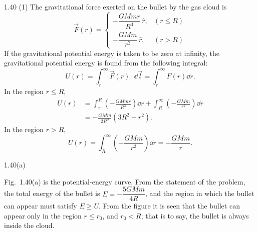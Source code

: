 \begin{solution}{1.40}
(1) The gravitational force exerted on the bullet by the gas cloud is
\begin{equation}
\vec{F}(r)=
\begin{cases}
-\dfrac{GMmr}{R^3}\,\hat{r}, & (r\le R)\\[2mm]
-\dfrac{GMm}{r^2}\,\hat{r}, & (r>R)
\end{cases} \tag{1}
\end{equation}
If the gravitational potential energy is taken to be zero at infinity, the gravitational potential energy is found from the following integral:
\begin{equation}
U(r)=\int_r^\infty\vec{F}(r)\cdot\dd\vec{l}=\int_r^\infty F(r)\dd r. \tag{2}
\end{equation}
In the region $r\le R$,
\begin{equation}
\begin{aligned}
U(r)&=\int_r^R\left(-\frac{GMmr}{R^3}\right)\dd r
+\int_R^\infty\left(-\frac{GMm}{r^2}\right)\dd r\\
&=-\frac{GMm}{2R^3}\left(3R^2-r^2\right).
\end{aligned} \tag{3}
\end{equation}
In the region $r>R$,
\begin{equation}
U(r)=\int_R^\infty\left(-\frac{GMm}{r^2}\right)\dd r=-\frac{GMm}{r}. \tag{4}
\end{equation}

\begin{figbox}{1.40(a)}
\end{figbox}

Fig.~1.40(a) is the potential-energy curve. From the statement of the problem, the total energy of the bullet is $E=-\dfrac{5GMm}{4R}$, and the region in which the bullet can appear must satisfy $E\ge U$. From the figure it is seen that the bullet can appear only in the region $r\le r_0$, and $r_0<R$; that is to say, the bullet is always inside the cloud.


\end{solution}
